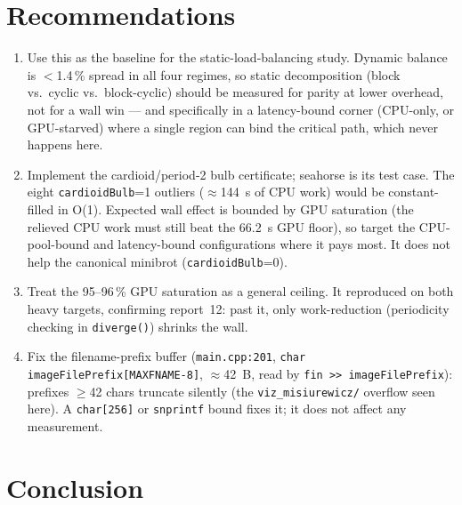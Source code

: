 \documentclass[
	english,
	letterpaper, oneside
]{article}
\begin{document}
\section{Recommendations}

\begin{enumerate}
    \item Use this as the baseline for the static-load-balancing study.
    Dynamic balance is $<$1.4\,\% spread in all four regimes, so static
    decomposition (block vs.\ cyclic vs.\ block-cyclic) should be measured for
    parity at lower overhead, not for a wall win --- and specifically in a
    latency-bound corner (CPU-only, or GPU-starved) where a single region can
    bind the critical path, which never happens here.

    \item Implement the cardioid/period-2 bulb certificate; seahorse is
    its test case. The eight \texttt{cardioidBulb}=1 outliers ($\approx$144~s of
    CPU work) would be constant-filled in O(1). Expected wall effect is bounded by
    GPU saturation (the relieved CPU work must still beat the 66.2~s GPU floor),
    so target the CPU-pool-bound and latency-bound configurations where it pays
    most. It does not help the canonical minibrot (\texttt{cardioidBulb}=0).

    \item Treat the 95--96\,\% GPU saturation as a general ceiling. It
    reproduced on both heavy targets, confirming report~12: past it, only
    work-reduction (periodicity checking in \texttt{diverge()}) shrinks the wall.

    \item Fix the filename-prefix buffer (\texttt{main.cpp:201},
    \texttt{char imageFilePrefix[MAXFNAME-8]}, $\approx$42~B, read by
    \texttt{fin >> imageFilePrefix}): prefixes $\ge$42 chars truncate silently
    (the \texttt{viz\_misiurewicz/} overflow seen here). A \texttt{char[256]} or
    \texttt{snprintf} bound fixes it; it does not affect any measurement.
\end{enumerate}

\section{Conclusion}
\end{document}
